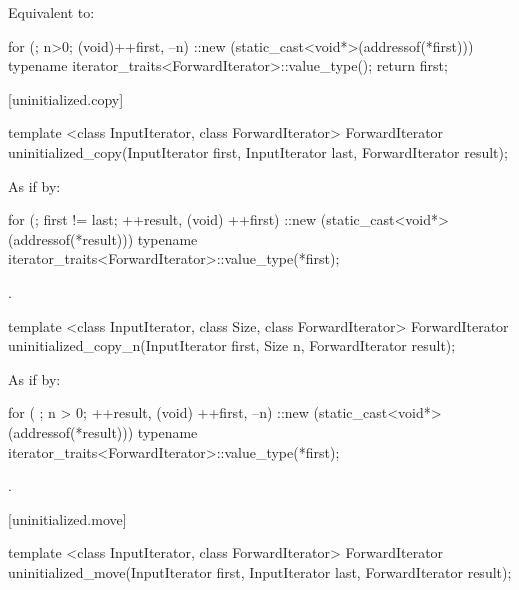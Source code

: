 \begin{itemdescr}
\pnum
\effects
Equivalent to:
\begin{codeblock}
for (; n>0; (void)++first, --n)
  ::new (static_cast<void*>(addressof(*first)))
    typename iterator_traits<ForwardIterator>::value_type();
return first;
\end{codeblock}
\end{itemdescr}

[uninitialized.copy]{}

%
\begin{itemdecl}
template <class InputIterator, class ForwardIterator>
  ForwardIterator uninitialized_copy(InputIterator first, InputIterator last,
                                     ForwardIterator result);
\end{itemdecl}

\begin{itemdescr}
\pnum
\effects
As if by:
\begin{codeblock}
for (; first != last; ++result, (void) ++first)
  ::new (static_cast<void*>(addressof(*result)))
    typename iterator_traits<ForwardIterator>::value_type(*first);
\end{codeblock}

\pnum
\returns
{}.
\end{itemdescr}

%
\begin{itemdecl}
template <class InputIterator, class Size, class ForwardIterator>
  ForwardIterator uninitialized_copy_n(InputIterator first, Size n,
                                       ForwardIterator result);
\end{itemdecl}

\begin{itemdescr}
\pnum
\effects
As if by:
\begin{codeblock}
for ( ; n > 0; ++result, (void) ++first, --n) {
  ::new (static_cast<void*>(addressof(*result)))
    typename iterator_traits<ForwardIterator>::value_type(*first);
}
\end{codeblock}

\pnum
\returns {}.
\end{itemdescr}

[uninitialized.move]{}

%
\begin{itemdecl}
template <class InputIterator, class ForwardIterator>
  ForwardIterator uninitialized_move(InputIterator first, InputIterator last,
                                     ForwardIterator result);
\end{itemdecl}

